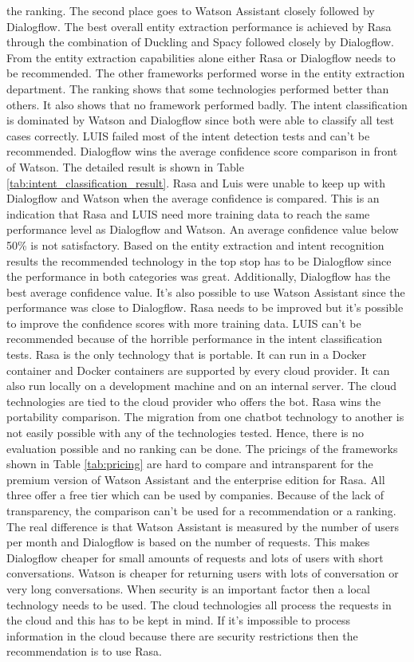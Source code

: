 the ranking.
The second place goes to Watson Assistant closely followed by Dialogflow.
The best overall entity extraction performance is achieved by Rasa through 
the combination of Duckling and Spacy followed closely by Dialogflow.
From the entity extraction capabilities alone either Rasa or 
Dialogflow needs to be recommended.
The other frameworks performed worse in the entity extraction 
department.
The ranking shows that some technologies performed better than others.
It also shows that no framework performed badly.
The intent classification is dominated by Watson and Dialogflow since 
both were able to classify all test cases correctly.
LUIS failed most of the intent detection tests and can't be recommended.
Dialogflow wins the average confidence score comparison in front of Watson.
The detailed result is shown in Table \ref{tab:intent_classification_result}.
Rasa and Luis were unable to keep up with Dialogflow and Watson when the 
average confidence is compared.
This is an indication that Rasa and LUIS need more training data to 
reach the same performance level as Dialogflow and Watson.
An average confidence value below 50\% is not satisfactory.
Based on the entity extraction and intent recognition results
the recommended technology in the top stop has to be Dialogflow
since the performance in both categories was great.
Additionally, Dialogflow has the best average confidence value.
It's also possible to use Watson Assistant since the performance was close to Dialogflow.
Rasa needs to be improved but it's possible to improve the confidence scores with more training data.
LUIS can't be recommended because of the horrible performance in the intent classification tests.
Rasa is the only technology that is portable.
It can run in a Docker container and Docker containers are supported by every 
cloud provider.
It can also run locally on a development machine and on an internal server.
The cloud technologies are tied to the cloud provider who offers the bot.
Rasa wins the portability comparison.
The migration from one chatbot technology to another is not easily possible with 
any of the technologies tested. 
Hence, there is no evaluation possible and no ranking can be done.
The pricings of the frameworks shown in Table \ref{tab:pricing} are hard to compare and intransparent for the premium version of Watson Assistant and the enterprise edition for Rasa.
All three offer a free tier which can be used by companies.
Because of the lack of transparency, the comparison can't be used for a recommendation or a ranking.
The real difference is that Watson Assistant is measured by the number of users per month and 
Dialogflow is based on the number of requests.
This makes Dialogflow cheaper for small amounts of requests and lots of users with short conversations.
Watson is cheaper for returning users with lots of conversation or very long conversations.
When security is an important factor then a local technology needs to be used.
The cloud technologies all process the requests in the cloud and this has to be 
kept in mind.
If it's impossible to process information in the cloud because there are security restrictions
then the recommendation is to use Rasa.

